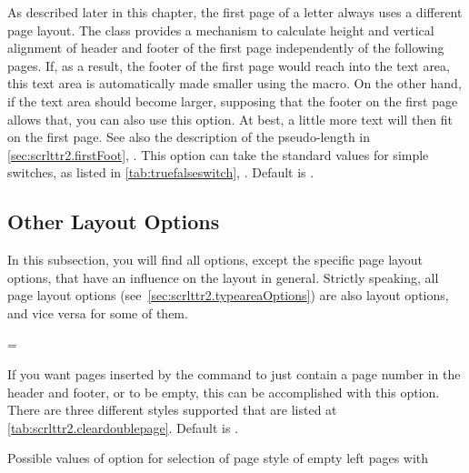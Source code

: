 \begin{Declaration}
\end{Declaration}
%
As described later in this chapter, the first page of a letter always
uses a different page layout. The  class provides a
mechanism to calculate height and vertical alignment of header and
footer of the first page independently of the following pages. If, as
a result, the footer of the first page would reach into the text area,
this text area is automatically made smaller using the
 macro. On the other
hand, if the text area should become larger, supposing that the footer
on the first page allows that, you can also use this option. At best,
a little more text will then fit on the first page. See also the
description of the pseudo-length  in
\autoref{sec:scrlttr2.firstFoot},
.  This option can
take the standard values for simple switches, as listed in
\autoref{tab:truefalseswitch},
. Default is
.
%
%
%
%

\subsection{Other Layout Options}
\label{sec:scrlttr2.layout}

In this subsection, you will find all options, except the specific
page layout options, that have an influence on the layout in
general. Strictly speaking, all page layout options
(see~\ref{sec:scrlttr2.typeareaOptions}) are also layout options, and
vice versa for some of them.

\begin{Declaration}
  =
\end{Declaration}
%
If you want pages inserted by the  command to
just contain a page number in the header and footer, or to be empty,
this can be accomplished with this option. There are three different
styles supported that are listed at
\autoref{tab:scrlttr2.cleardoublepage}. Default is .

\begin{table}
  \caption[{Possible values of option  with
    }]{Possible values of option  for
    selection of page style of empty left pages with }
  \label{tab:scrlttr2.cleardoublepage}
  \begin{desctabular}
  \end{desctabular}
\end{table}
%
%

